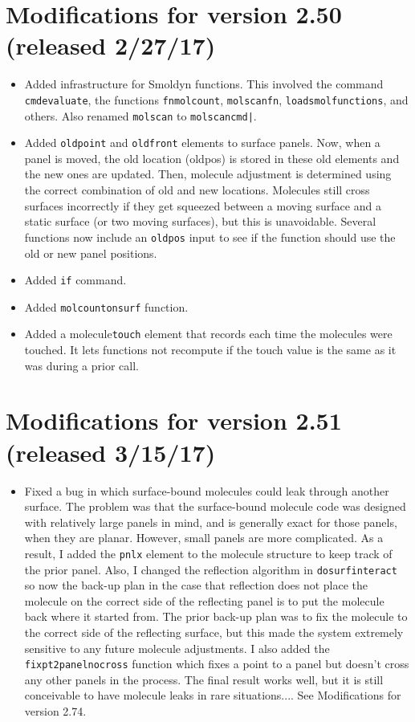 \documentclass {scrbook}
\newcommand {\ttt} {\texttt}
\begin{document}
\section{Modifications for version 2.50 (released 2/27/17)}
\begin{itemize}
\item Added infrastructure for Smoldyn functions. This involved the command \ttt{cmdevaluate}, the functions \ttt{fnmolcount}, \ttt{molscanfn}, \ttt{loadsmolfunctions}, and others. Also renamed \ttt{molscan} to \ttt{molscancmd|}.
\item Added \ttt{oldpoint} and \ttt{oldfront} elements to surface panels. Now, when a panel is moved, the old location (oldpos) is stored in these old elements and the new ones are updated. Then, molecule adjustment is determined using the correct combination of old and new locations. Molecules still cross surfaces incorrectly if they get squeezed between a moving surface and a static surface (or two moving surfaces), but this is unavoidable. Several functions now include an \ttt{oldpos} input to see if the function should use the old or new panel positions.
\item Added \ttt{if} command.
\item Added \ttt{molcountonsurf} function.
\item Added a molecule\ttt{touch} element that records each time the molecules were touched. It lets functions not recompute if the touch value is the same as it was during a prior call.
\end{itemize}

\section{Modifications for version 2.51 (released 3/15/17)}
\begin{itemize}
\item Fixed a bug in which surface-bound molecules could leak through another surface. The problem was that the surface-bound molecule code was designed with relatively large panels in mind, and is generally exact for those panels, when they are planar. However, small panels are more complicated. As a result, I added the \ttt{pnlx} element to the molecule structure to keep track of the prior panel. Also, I changed the reflection algorithm in \ttt{dosurfinteract} so now the back-up plan in the case that reflection does not place the molecule on the correct side of the reflecting panel is to put the molecule back where it started from. The prior back-up plan was to fix the molecule to the correct side of the reflecting surface, but this made the system extremely sensitive to any future molecule adjustments. I also added the \ttt{fixpt2panelnocross} function which fixes a point to a panel but doesn't cross any other panels in the process. The final result works well, but it is still conceivable to have molecule leaks in rare situations.... See Modifications for version 2.74.
\end{itemize}
\end{document}
